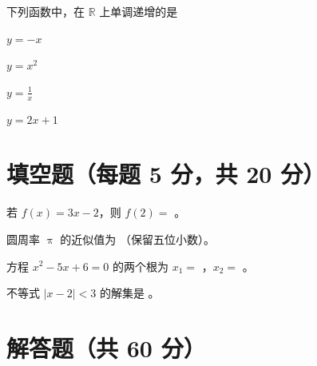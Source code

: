 \documentclass{exam-zh}
\begin{document}
\begin{question}
  下列函数中，在 $\mathbb{R}$ 上单调递增的是\paren[D]
  \begin{choices}
    \item $y = -x$
    \item $y = x^2$
    \item $y = \frac{1}{x}$
    \item $y = 2x + 1$   %
  \end{choices}
\end{question}


\section{填空题（每题 5 分，共 20 分）}

\begin{question}
  若 $f(x) = 3x - 2$，则 $f(2) = $ \fillin[4]。
\end{question}

\begin{question}
  圆周率 $\uppi$ 的近似值为 \fillin[3.14159]（保留五位小数）。
\end{question}

\begin{question}
  方程 $x^2 - 5x + 6 = 0$ 的两个根为 $x_1 = $ \fillin[2]，$x_2 = $ \fillin[3]。
\end{question}

\begin{question}
  不等式 $|x - 2| < 3$ 的解集是 \fillin[{$(-1, 5)$}]。
\end{question}


\section{解答题（共 60 分）}
\end{document}
